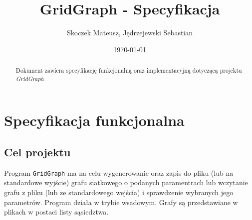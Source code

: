 \documentclass[11pt,a4paper]{report}
\title{\Huge GridGraph - Specyfikacja}
\author{Skoczek Mateusz, Jędrzejewski Sebastian}
\date{\today}
\begin{document}
    \maketitle
    

    \begin{abstract}
        Dokument zawiera specyfikację funkcjonalną oraz implementacyjną dotyczącą projektu \textsl{GridGraph}
    \end{abstract}


    \tableofcontents
    \thispagestyle{empty}


    \newpage
    \chapter{Specyfikacja funkcjonalna}


    \newpage
    \section{Cel projektu}
    Program \verb|GridGraph| ma na celu wygenerowanie oraz zapis do pliku (lub na standardowe wyjście) grafu siatkowego o podanych paramentrach lub wczytanie grafu z pliku (lub ze standardowego wejścia) i sprawdzenie wybranych jego parametrów. Program działa w trybie wsadowym. Grafy są przedstawiane w plikach w postaci listy sąsiedztwa.

    \newpage
\end{document}
